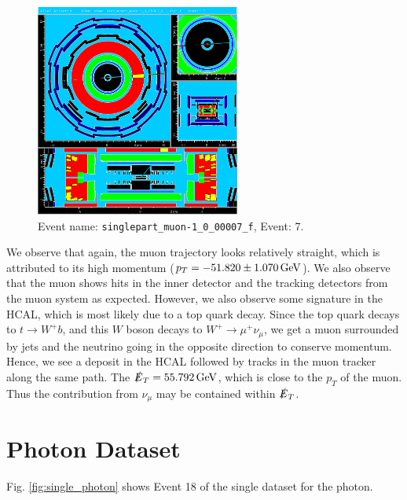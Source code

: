 \documentclass[a4paper]{report}
\numberwithin{equation}{section}
\begin{document}
\begin{figure}[htpb]
    \centering
    \includegraphics[width=0.6\textwidth]{muon_event7.eps}
    \caption{Event name: \texttt{singlepart\_muon-1\_0\_00007\_f}, Event: 7. }
    \label{fig:single_muon}
\end{figure}

We observe that again, the muon trajectory looks relatively straight, which is attributed to its high momentum ($p_T = \SI{-51.82 \pm 1.070}{\giga\electronvolt}$).
We also observe that the muon shows hits in the inner detector and the tracking detectors from the muon system as expected. 
However, we also observe some signature in the HCAL, which is most likely due to a top quark decay. Since the top quark decays to $t \rightarrow W^+ b$, and this $W$ boson decays to $W^+ \rightarrow \mu^+ \nu_{\mu}$, we get a muon surrounded by jets and the neutrino going in the opposite direction to conserve momentum. Hence, we see a deposit in the HCAL followed by tracks in the muon tracker along the same path. The $\slashed{E}_T = \SI{55.792}{\giga\electronvolt}$, which is close to the $p_T$ of the muon.
Thus the contribution from $\nu_\mu$ may be contained within $\slashed{E}_T$.

\section{Photon Dataset}

Fig. \ref{fig:single_photon} shows Event 18 of the single dataset for the photon.
\end{document}
